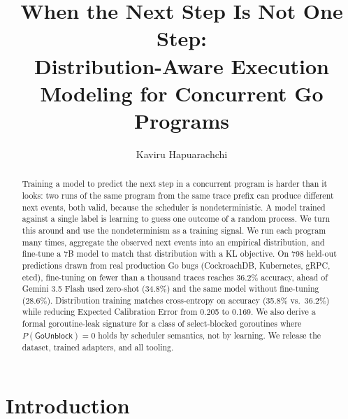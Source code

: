 \documentclass{svproc}
\newcommand{\punblock}{\textsf{GoUnblock}}
\begin{document}
\mainmatter

\title{When the Next Step Is Not One Step:\\
Distribution-Aware Execution Modeling for Concurrent Go Programs}


\author{Kaviru Hapuarachchi}

\maketitle

\begin{abstract}
Training a model to predict the next step in a concurrent program is
harder than it looks: two runs of the same program from the same trace
prefix can produce different next events, both valid, because the
scheduler is nondeterministic. A model trained against a single label
is learning to guess one outcome of a random process. We turn this
around and use the nondeterminism as a training signal. We run each
program many times, aggregate the observed next events into an empirical
distribution, and fine-tune a 7B model to match that distribution with
a KL objective. On 798 held-out predictions drawn from real production
Go bugs (CockroachDB, Kubernetes, gRPC, etcd), fine-tuning on fewer
than a thousand traces reaches 36.2\% accuracy, ahead of Gemini 3.5
Flash used zero-shot (34.8\%) and the same model without fine-tuning
(28.6\%). Distribution training matches cross-entropy on accuracy
(35.8\% vs.\ 36.2\%) while reducing Expected Calibration Error from
0.205 to 0.169. We also derive a formal goroutine-leak signature for a
class of select-blocked goroutines where $P(\punblock)=0$ holds by
scheduler semantics, not by learning. We release the dataset, trained
adapters, and all tooling.
\end{abstract}

\section{Introduction}
\end{document}
